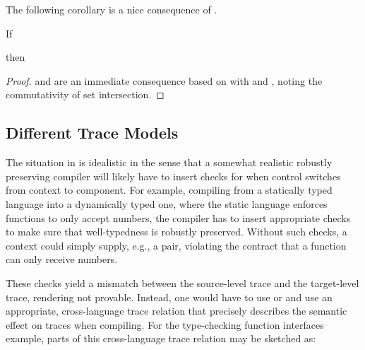 \documentclass[a4paper,12pt]{article}
\begin{document}
The following corollary is a nice consequence of .
\begin{corollary}[\Coqed]{}
  If 
  \begin{assumptions}
  \end{assumptions}
  then
  \begin{goals}
  \end{goals}
\end{corollary}
\begin{proof}
   and  are an immediate consequence based on  with  and , noting the commutativity of set intersection.
\end{proof}

\subsection{Different Trace Models}\label{subsec:rtpc-different-trace-models}

The situation in  is idealistic in the sense that a somewhat realistic robustly preserving compiler will likely have to insert checks for when control switches from context to component.
For example, compiling from a statically typed language into a dynamically typed one, where the static language enforces functions to only accept numbers, the compiler has to insert appropriate checks to make sure that well-typedness is robustly preserved.
Without such checks, a context could simply supply, e.g., a pair, violating the contract that a function can only receive numbers.

These checks yield a mismatch between the source-level trace and the target-level trace, rendering  not provable.
Instead, one would have to use  or  and use an appropriate, cross-language trace relation that precisely describes the semantic effect on traces when compiling.
For the type-checking function interfaces example, parts of this cross-language trace relation may be sketched as:
\end{document}
